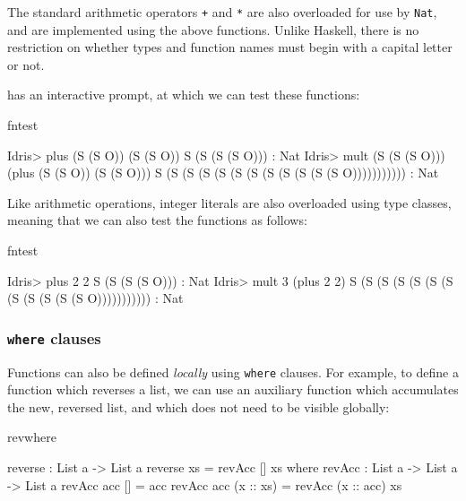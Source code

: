 \noindent
The standard arithmetic operators \texttt{+} and \texttt{*} are also overloaded
for use by \texttt{Nat}, and are implemented
using the above functions.  Unlike Haskell, there is no restriction on whether
types and function names must begin with a capital letter or not. 

\Idris{} has an interactive prompt, at which we can test these functions:

\begin{SaveVerbatim}{fntest}

Idris> plus (S (S O)) (S (S O))
S (S (S (S O))) : Nat
Idris> mult (S (S (S O))) (plus (S (S O)) (S (S O)))
S (S (S (S (S (S (S (S (S (S (S (S O))))))))))) : Nat

\end{SaveVerbatim}

\noindent
Like arithmetic operations, integer literals are also overloaded using type classes, 
meaning that we can also test the functions as follows:

\begin{SaveVerbatim}{fntest}

Idris> plus 2 2 
S (S (S (S O))) : Nat
Idris> mult 3 (plus 2 2)
S (S (S (S (S (S (S (S (S (S (S (S O))))))))))) : Nat

\end{SaveVerbatim}

\subsubsection{\texttt{where} clauses}

Functions can also be defined \emph{locally} using \texttt{where} clauses. For example,
to define a function which reverses a list, we can use an auxiliary function which
accumulates the new, reversed list, and which does not need to be visible globally:

\begin{SaveVerbatim}{revwhere}

reverse : List a -> List a
reverse xs = revAcc [] xs where
  revAcc : List a -> List a -> List a
  revAcc acc [] = acc
  revAcc acc (x :: xs) = revAcc (x :: acc) xs

\end{SaveVerbatim}

